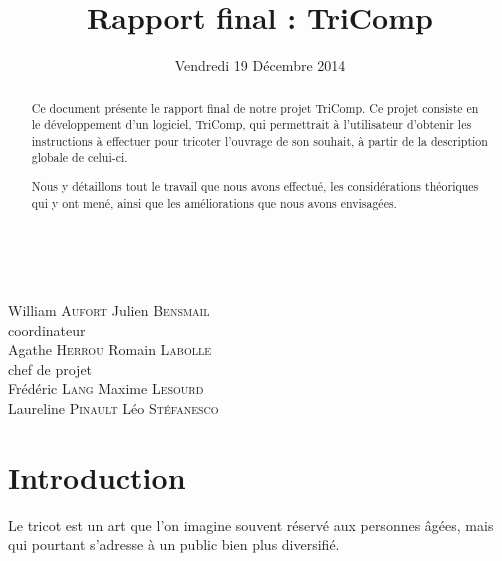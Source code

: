 \documentclass{article}
\title{Rapport final : TriComp}
\author{}
\date{Vendredi 19 Décembre 2014}
\begin{document}

\makeatletter %
  \begin{titlepage}
    \begin{center}
       {\LARGE \@title} \\
       \vspace{2cm} {\large \@date}
       \vspace{3cm}
    \end{center}
       {\large {William \textsc{Aufort} \hfill Julien
           \textsc{Bensmail} \\}
    \vspace{1cm} {\hfill coordinateur \\} {Agathe \textsc{Herrou}
      \hfill Romain \textsc{Labolle} \\}
       \vspace{1cm} {chef de projet \\}
       \vspace{1.5cm} {Frédéric \textsc{Lang} \hfill Maxime
         \textsc{Lesourd} \\} {Laureline \textsc{Pinault} \hfill Léo
         \textsc{Stéfanesco} \\}}
       \vspace{2.5cm}
    \begin{abstract}
Ce document présente le rapport final de notre projet TriComp. Ce projet consiste en le développement d'un logiciel, TriComp, 
qui permettrait à l'utilisateur d'obtenir les instructions à effectuer pour tricoter l'ouvrage de son souhait, à partir de la 
description globale de celui-ci.

Nous y détaillons tout le travail que nous avons effectué, les considérations théoriques qui y ont mené, ainsi que les améliorations 
que nous avons envisagées.
    \end{abstract}
  \end{titlepage}
\makeatother

\newpage

\tableofcontents

\newpage

\section*{Introduction}

Le tricot est un art que l'on imagine souvent réservé aux personnes
âgées, mais qui pourtant s'adresse à un public bien plus diversifié. 
\end{document}
